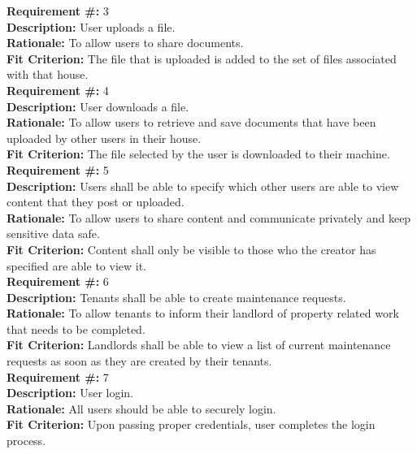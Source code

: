 \documentclass[12pt, titlepage]{article}
\begin{document}
\textbf{Requirement \#:} 3 
       \\
      \textbf{Description:} User uploads a file. \\
      \textbf{Rationale:} To allow users to share documents. \\
      \textbf{Fit Criterion:} The file that is uploaded is added to the set of
      files associated with that house. \\

\textbf{Requirement \#:} 4
       \\
      \textbf{Description:} User downloads a file. \\
      \textbf{Rationale:} To allow users to retrieve and save documents that 
have
      been uploaded by other users in their house. \\
      \textbf{Fit Criterion:} The file selected by the user is downloaded to
      their machine. \\

\textbf{Requirement \#:} 5
       \\
      \textbf{Description:} Users shall be able to specify which other users
      are able to view content that they post or uploaded. \\
      \textbf{Rationale:} To allow users to share content and communicate
      privately and keep sensitive data safe. \\
      \textbf{Fit Criterion:} Content shall only be visible to those who the
      creator has specified are able to view it. \\

\textbf{Requirement \#:} 6
       \\
      \textbf{Description:} Tenants shall be able to create maintenance
      requests. \\
      \textbf{Rationale:} To allow tenants to inform their landlord of property
      related work that needs to be completed. \\
      \textbf{Fit Criterion:} Landlords shall be able to view a list of current
      maintenance requests as soon as they are created by their tenants.\\
          
\textbf{Requirement \#:} 7
       \\
      \textbf{Description: }{User login.} \\
      \textbf{Rationale: }{All users should be able to securely login.} \\
      \textbf{Fit Criterion: }{Upon passing proper credentials, user completes 
the login process.} \\
\end{document}
